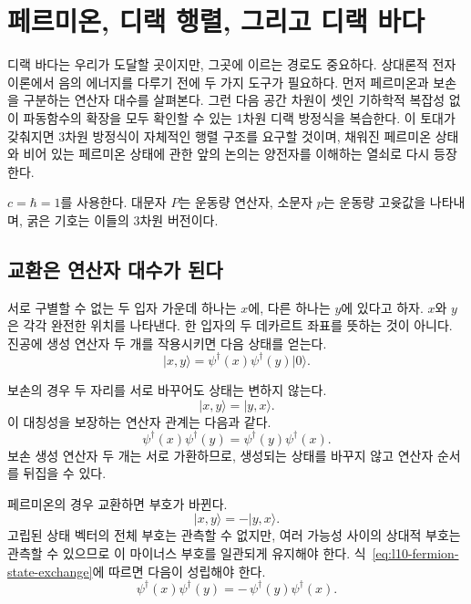 \chapter{페르미온, 디랙 행렬, 그리고 디랙 바다}

디랙 바다는 우리가 도달할 곳이지만, 그곳에 이르는 경로도 중요하다. 상대론적 전자 이론에서 음의 에너지를 다루기 전에 두 가지 도구가 필요하다. 먼저 페르미온과 보손을 구분하는 연산자 대수를 살펴본다. 그런 다음 공간 차원이 셋인 기하학적 복잡성 없이 파동함수의 확장을 모두 확인할 수 있는 1차원 디랙 방정식을 복습한다. 이 토대가 갖춰지면 3차원 방정식이 자체적인 행렬 구조를 요구할 것이며, 채워진 페르미온 상태와 비어 있는 페르미온 상태에 관한 앞의 논의는 양전자를 이해하는 열쇠로 다시 등장한다.

\(c=\hbar=1\)를 사용한다. 대문자 \(P\)는 운동량 연산자, 소문자 \(p\)는 운동량 고윳값을 나타내며, 굵은 기호는 이들의 3차원 버전이다.

\section{교환은 연산자 대수가 된다}

서로 구별할 수 없는 두 입자 가운데 하나는 \(x\)에, 다른 하나는 \(y\)에 있다고 하자. \(x\)와 \(y\)은 각각 완전한 위치를 나타낸다. 한 입자의 두 데카르트 좌표를 뜻하는 것이 아니다. 진공에 생성 연산자 두 개를 작용시키면 다음 상태를 얻는다.
\begin{equation}
\lvert x,y\rangle
=
\psi^\dagger(x)\psi^\dagger(y)\lvert0\rangle.
\label{eq:l10-two-particle-state}
\end{equation}

보손의 경우 두 자리를 서로 바꾸어도 상태는 변하지 않는다.
\begin{equation}
\lvert x,y\rangle=\lvert y,x\rangle.
\end{equation}
이 대칭성을 보장하는 연산자 관계는 다음과 같다.
\begin{equation}
\psi^\dagger(x)\psi^\dagger(y)
=
\psi^\dagger(y)\psi^\dagger(x).
\label{eq:l10-boson-exchange}
\end{equation}
보손 생성 연산자 두 개는 서로 가환하므로, 생성되는 상태를 바꾸지 않고 연산자 순서를 뒤집을 수 있다.

페르미온의 경우 교환하면 부호가 바뀐다.
\begin{equation}
\lvert x,y\rangle=-\lvert y,x\rangle.
\label{eq:l10-fermion-state-exchange}
\end{equation}
고립된 상태 벡터의 전체 부호는 관측할 수 없지만, 여러 가능성 사이의 상대적 부호는 관측할 수 있으므로 이 마이너스 부호를 일관되게 유지해야 한다. 식~\eqref{eq:l10-fermion-state-exchange}에 따르면 다음이 성립해야 한다.
\begin{equation}
\psi^\dagger(x)\psi^\dagger(y)
=
-\,\psi^\dagger(y)\psi^\dagger(x).
\label{eq:l10-fermion-operator-exchange}
\end{equation}

